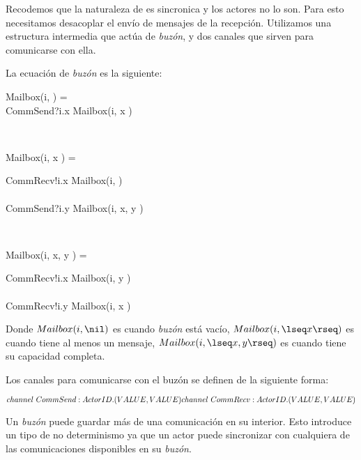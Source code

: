 Recodemos que la naturaleza de \CSP es sincronica y los actores no lo son. Para esto necesitamos desacoplar el envío de mensajes de la recepción. Utilizamos una estructura intermedia que actúa de \textit{buzón}, y dos canales que sirven para comunicarse con ella.

La ecuación de \textit{buzón} es la siguiente:

\begin{process}
\begin{block}
Mailbox(i, \nil) = {} \\ \quad
CommSend?i.x \then Mailbox(i, \lseq x \rseq) 
\end{block} \\

\begin{block}
Mailbox(i, \lseq x \rseq) = {} \\ \quad 
  \begin{block}
    CommRecv!i.x \then Mailbox(i, \nil) \\
    \Extchoice \\
    CommSend?i.y \then Mailbox(i, \lseq x, y \rseq) 
  \end{block}
\end{block} \\

\begin{block}
Mailbox(i, \lseq x, y \rseq) = {} \\ \quad
  \begin{block}
    CommRecv!i.x \then Mailbox(i, \lseq y \rseq) \\
    \Extchoice \\
    CommRecv!i.y \then Mailbox(i, \lseq x \rseq) 
  \end{block} 
\end{block}

\end{process}

Donde $Mailbox(i, \nil)$ es cuando \textit{buzón} está vacío, $Mailbox(i, \lseq x \rseq)$ es cuando tiene al menos un mensaje, $Mailbox(i, \lseq x, y \rseq)$ es cuando tiene su capacidad completa.

Los canales para comunicarse con el buzón se definen de la siguiente forma:

\[
channel\ CommSend:ActorID.(VALUE, VALUE)\\
channel\ CommRecv:ActorID.(VALUE, VALUE)
\]

Un \textit{buzón} puede guardar más de una comunicación en su interior. Esto introduce un tipo de no determinismo ya que un actor puede sincronizar con cualquiera de las comunicaciones disponibles en su \textit{buzón}.

